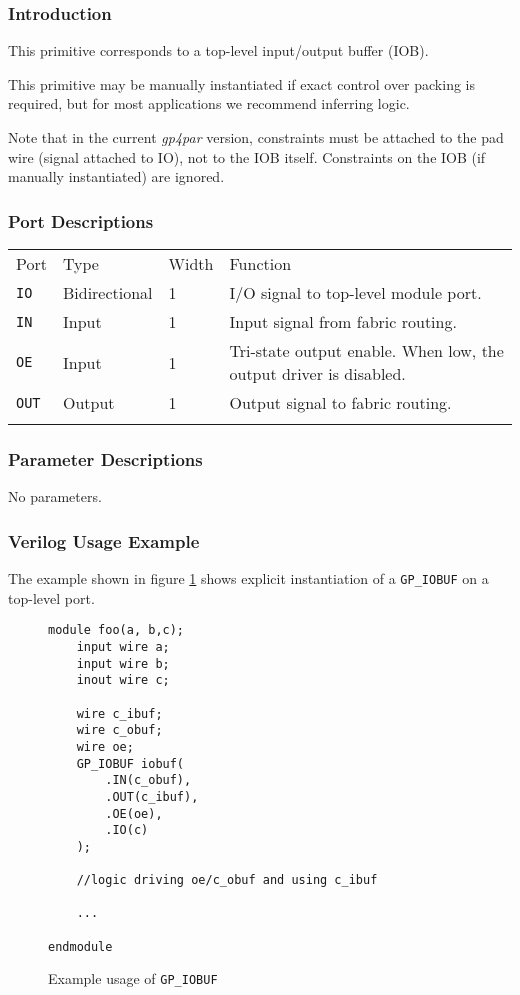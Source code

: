 \documentclass[11pt]{article}
\newcommand{\namestyle}[1]{\textit{#1}}
\newcommand{\tokenstyle}[1]{\texttt{#1}}
\newcommand{\whenstyle}[1]{{\fontseries{sb}\selectfont#1}}
\newcommand{\thinhline}{\Xhline{1\arrayrulewidth}}
\newcommand{\thickhline}{\Xhline{2.5\arrayrulewidth}}
\begin{document}
\subsubsection{Introduction}
This primitive corresponds to a top-level input/output buffer (IOB).

This primitive may be manually instantiated if exact control over packing is required, but for most applications we
recommend inferring logic.

Note that in the current \namestyle{gp4par} version, constraints must be attached to the pad wire (signal attached to IO), not to the IOB itself. Constraints on the IOB (if manually instantiated) are ignored.

\subsubsection{Port Descriptions}

\begin{tabularx}{\textwidth}{lllX}
\thinhline
\whenstyle{Port} & \whenstyle{Type} & \whenstyle{Width} & \whenstyle{Function} \\
\thickhline
\tokenstyle{IO} & Bidirectional & 1 & I/O signal to top-level module port. \\
\thinhline
\tokenstyle{IN} & Input & 1 & Input signal from fabric routing. \\
\thinhline
\tokenstyle{OE} & Input & 1 & Tri-state output enable. When low, the output driver is disabled. \\
\thinhline
\tokenstyle{OUT} & Output & 1 & Output signal to fabric routing. \\
\thinhline
\end{tabularx}

\subsubsection{Parameter Descriptions}

No parameters.

\subsubsection{Verilog Usage Example}

The example shown in figure \ref{gp-iobuf-example} shows explicit instantiation of a \tokenstyle{GP\_IOBUF} on a top-level port.

\begin{figure}[h]
\begin{lstlisting}
module foo(a, b,c);
	input wire a;
	input wire b;
	inout wire c;

	wire c_ibuf;
	wire c_obuf;
	wire oe;
	GP_IOBUF iobuf(
		.IN(c_obuf),
		.OUT(c_ibuf),
		.OE(oe),
		.IO(c)
	);

	//logic driving oe/c_obuf and using c_ibuf

	...

endmodule
\end{lstlisting}
\caption{Example usage of \tokenstyle{GP\_IOBUF}}
\label{gp-iobuf-example}
\end{figure}
\end{document}
